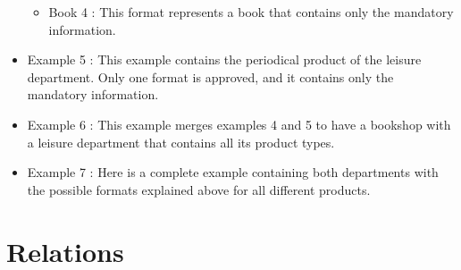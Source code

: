 \documentclass{article}
\begin{document}
\begin{itemize}
\begin{itemize}
        \item Book 4 : This format represents a book that contains only the mandatory information.
    \end{itemize}
    \item Example 5 : This example contains the periodical product of the leisure department. Only one format is approved, and it contains only the mandatory information.
    \item Example 6 : This example merges examples 4 and 5 to have a bookshop with a leisure department that contains all its product types.
    \item Example 7 : Here is a complete example containing both departments with the possible formats explained above for all different products.
\end{itemize}

\appendix

\section{Relations}
\end{document}
